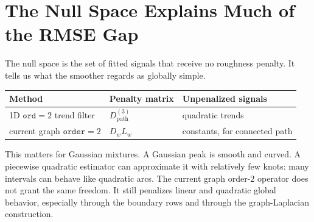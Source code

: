 \documentclass[11pt]{article}
\begin{document}
\section{The Null Space Explains Much of the RMSE Gap}

The null space is the set of fitted signals that receive no roughness penalty.
It tells us what the smoother regards as globally simple.

\begin{center}
\begin{tabular}{lll}
\toprule
Method & Penalty matrix & Unpenalized signals\\
\midrule
1D \(\texttt{ord}=2\) trend filter & \(D^{(3)}_{\mathrm{path}}\) &
quadratic trends\\
current graph \(\texttt{order}=2\) & \(D_wL_w\) &
constants, for connected path\\
\bottomrule
\end{tabular}
\end{center}

This matters for Gaussian mixtures.  A Gaussian peak is smooth and curved.  A
piecewise quadratic estimator can approximate it with relatively few knots:
many intervals can behave like quadratic arcs.  The current graph order-2
operator does not grant the same freedom.  It still penalizes linear and
quadratic global behavior, especially through the boundary rows and through the
graph-Laplacian construction.
\end{document}
